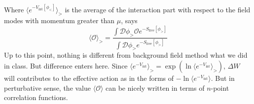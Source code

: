 \documentclass[12pt,halfline,a4paper]{ouparticle}
\begin{document}
Where $\langle e^{-V_\text{int}[\phi_<]}\rangle_>$ is the average of the interaction part with respect to the field modes with momentum greater than $\mu$, says
\begin{equation}
	\label{eq:largeexpectation}
	\langle\mathcal O \rangle_> = \frac{\int \mathcal D \phi_>\mathcal O e^{-S_\text{free}[\phi_>]}}{\int \mathcal D \phi_> e^{-S_\text{free}[\phi_>]}}
\end{equation}
Up to this point, nothing is different from background field method what we did in class. But difference enters here. Since $\langle e^{-V_\text{int}} \rangle_> =\exp(\ln\langle e^{-V_\text{int}} \rangle_>)$, $\Delta W$ will contributes to the effective action as in the forms of $-\ln\langle e^{-V_\text{int}}\rangle$.
But in perturbative sense, the value $\langle \mathcal O \rangle$ can be nicely written in terms of $n$-point correlation functions. 
\end{document}
